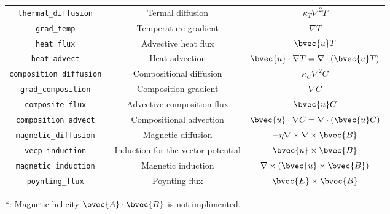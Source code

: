 \begin{table}[htp]
\begin{center}
\begin{tabular}{|c|c|c|}
\hline
\tt thermal\_diffusion & Termal diffusion & $ \kappa_{T} \nabla^{2} T $ \\
\tt grad\_temp & Temperature gradient & $ \nabla T$ \\
\tt heat\_flux & Advective heat flux & $ \bvec{u} T$ \\
\tt heat\_advect & Heat advection & $ \bvec{u} \cdot \nabla T = \nabla \cdot \left(  \bvec{u} T \right) $ \\
\hline
\tt composition\_diffusion & Compositional diffusion & $ \kappa_{C} \nabla^{2} C $ \\
\tt grad\_composition & Composition gradient & $ \nabla C$ \\
\tt composite\_flux & Advective composition flux & $ \bvec{u} C$ \\
\tt composition\_advect & Compositional advection & $ \bvec{u} \cdot \nabla C = \nabla \cdot \left(  \bvec{u} C \right) $ \\
\hline
\tt magnetic\_diffusion & Magnetic diffusion
& $-\eta \nabla \times \nabla \times \bvec{B}$ \\
\tt vecp\_induction & Induction for the vector potential &  $ \bvec{u} \times \bvec{B} $ \\
\tt magnetic\_induction & Magnetic induction &  $ \nabla \times \left(\bvec{u} \times \bvec{B}\right) $ \\
\tt poynting\_flux & Poynting flux &  $ \bvec{E} \times \bvec{B} $ \\
\hline
\end{tabular}
\end{center}
\label{table:fields}
\end{table}
*: Magnetic helicity $\bvec{A} \cdot \bvec{B} $ is not implimented.
%
%
